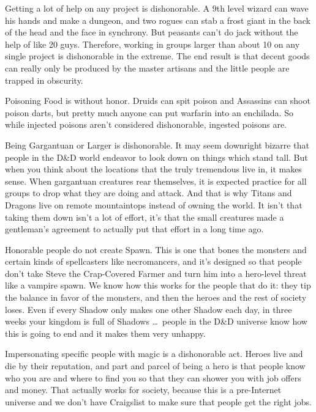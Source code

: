 \listone
    \item Getting a lot of help on any project is dishonorable. A 9th level wizard can wave his hands and make a dungeon, and two rogues can stab a frost giant in the back of the head and the face in synchrony. But peasants can't do jack without the help of like 20 guys. Therefore, working in groups larger than about 10 on any single project is dishonorable in the extreme. The end result is that decent goods can really only be produced by the master artisans and the little people are trapped in obscurity.
    \item Poisoning Food is without honor. Druids can spit poison and Assassins can shoot poison darts, but pretty much anyone can put warfarin into an enchilada. So while injected poisons aren't considered dishonorable, ingested poisons are.
    \item Being Gargantuan or Larger is dishonorable. It may seem downright bizarre that people in the D\&D world endeavor to look down on things which stand tall. But when you think about the locations that the truly tremendous live in, it makes sense. When gargantuan creatures rear themselves, it is expected practice for all groups to drop what they are doing and attack. And that is why Titans and Dragons live on remote mountaintops instead of owning the world. It isn't that taking them down isn't a lot of effort, it's that the small creatures made a gentleman's agreement to actually put that effort in a long time ago.
    \item Honorable people do not create Spawn. This is one that bones the monsters and certain kinds of spellcasters like necromancers, and it's designed so that people don't take Steve the Crap-Covered Farmer and turn him into a hero-level threat like a vampire spawn. We know how this works for the people that do it: they tip the balance in favor of the monsters, and then the heroes and the rest of society loses. Even if every Shadow only makes one other Shadow each day, in three weeks your kingdom is full of Shadows \ldots\ people in the D\&D universe know how this is going to end and it makes them very unhappy.
    \item Impersonating specific people with magic is a dishonorable act. Heroes live and die by their reputation, and part and parcel of being a hero is that people know who you are and where to find you so that they can shower you with job offers and money. That actually works for society, because this is a pre-Internet universe and we don't have Craigslist to make sure that people get the right jobs.
